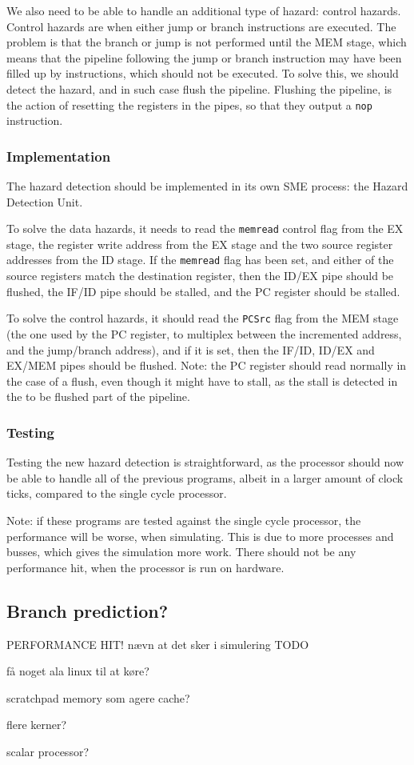 We also need to be able to handle an additional type of hazard: control
hazards. Control hazards are when either jump or branch instructions are
executed. The problem is that the branch or jump is not performed until the MEM
stage, which means that the pipeline following the jump or branch instruction
may have been filled up by instructions, which should not be executed. To solve
this, we should detect the hazard, and in such case flush the pipeline.
Flushing the pipeline, is the action of resetting the registers in the pipes,
so that they output a \texttt{nop} instruction.

\subsubsection*{Implementation}
The hazard detection should be implemented in its own SME process: the Hazard
Detection Unit.

To solve the data hazards, it needs to read the \texttt{memread} control flag
from the EX stage, the register write address from the EX stage and the two
source register addresses from the ID stage. If the \texttt{memread} flag has
been set, and either of the source registers match the destination register,
then the ID/EX pipe should be flushed, the IF/ID pipe should be stalled, and
the PC register should be stalled.

To solve the control hazards, it should read the \texttt{PCSrc} flag from the
MEM stage (the one used by the PC register, to multiplex between the
incremented address, and the jump/branch address), and if it is set, then the
IF/ID, ID/EX and EX/MEM pipes should be flushed. Note: the PC register should
read normally in the case of a flush, even though it might have to stall, as
the stall is detected in the to be flushed part of the pipeline.

\subsubsection*{Testing}
Testing the new hazard detection is straightforward, as the processor should
now be able to handle all of the previous programs, albeit in a larger amount
of clock ticks, compared to the single cycle processor.

Note: if these programs are tested against the single cycle processor, the
performance will be worse, when simulating. This is due to more processes and
busses, which gives the simulation more work. There should not be any
performance hit, when the processor is run on hardware.

\subsection{Branch prediction?} PERFORMANCE HIT! nævn at det sker i simulering
TODO

få noget ala linux til at køre?

scratchpad memory som agere cache?

flere kerner?

scalar processor?



